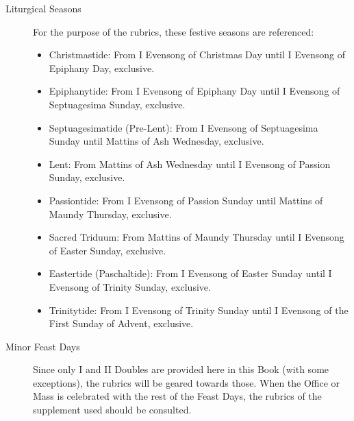 \begin{description}
\item[Liturgical Seasons] For the purpose of the rubrics, these festive seasons are referenced:
    \begin{itemize}
        \item Christmastide: From I Evensong of Christmas Day until I Evensong of Epiphany Day, exclusive.%
        \item Epiphanytide: From I Evensong of Epiphany Day until I Evensong of Septuagesima Sunday, exclusive.
        \item Septuagesimatide (Pre-Lent): From I Evensong of Septuagesima Sunday until Mattins of Ash Wednesday, exclusive.
        \item Lent: From Mattins of Ash Wednesday until I Evensong of Passion Sunday, exclusive.
        \item Passiontide: From I Evensong of Passion Sunday until Mattins of Maundy Thursday, exclusive.
        \item Sacred Triduum: From Mattins of Maundy Thursday until I Evensong of Easter Sunday, exclusive.
        \item Eastertide (Paschaltide): From I Evensong of Easter Sunday until I Evensong of Trinity Sunday, exclusive.
        \item Trinitytide: From I Evensong of Trinity Sunday until I Evensong of the First Sunday of Advent, exclusive.
    \end{itemize}
\item[Minor Feast Days] Since only I and II Doubles are provided here in this Book (with some exceptions), the rubrics will be geared towards those. When the Office or Mass is celebrated with the rest of the Feast Days, the rubrics of the supplement used should be consulted.%


\end{description}
